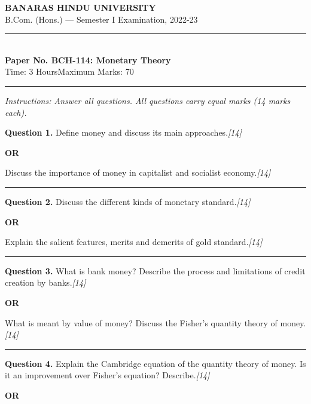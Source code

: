 \documentclass[11pt,a4paper]{article}
\newcommand{\pts}[1]{\hfill   \textit{[#1]}}
\begin{document}
\begin{center}
  {\large\bfseries BANARAS HINDU UNIVERSITY}\\[2pt]
  {\normalsize B.Com. (Hons.) --- Semester I Examination, 2022-23}\\[6pt]
  \rule{0.8\linewidth}{0.5pt}\\[6pt]
  {\large\bfseries Paper No. BCH-114: Monetary Theory}\\[4pt]
  {\normalsize Time: 3 Hours\hfill Maximum Marks: 70}
\end{center}

\rule{\linewidth}{0.4pt}

\smallskip



\noindent   \textit{Instructions: Answer all questions. All questions carry equal marks (14 marks each).}

\bigskip




\noindent   \textbf{Question 1.}
Define money and discuss its main approaches.\pts{14}

\centerline{   \textbf{OR}}

Discuss the importance of money in capitalist and socialist economy.\pts{14}

\medskip\rule{\linewidth}{0.2pt}




\noindent   \textbf{Question 2.}
Discuss the different kinds of monetary standard.\pts{14}

\centerline{   \textbf{OR}}

Explain the salient features, merits and demerits of gold standard.\pts{14}

\medskip\rule{\linewidth}{0.2pt}




\noindent   \textbf{Question 3.}
What is bank money? Describe the process and limitations of credit creation by banks.\pts{14}

\centerline{   \textbf{OR}}

What is meant by value of money? Discuss the Fisher's quantity theory of money.\pts{14}

\medskip\rule{\linewidth}{0.2pt}




\noindent   \textbf{Question 4.}
Explain the Cambridge equation of the quantity theory of money. Is it an improvement over Fisher's equation? Describe.\pts{14}

\centerline{   \textbf{OR}}
\end{document}
